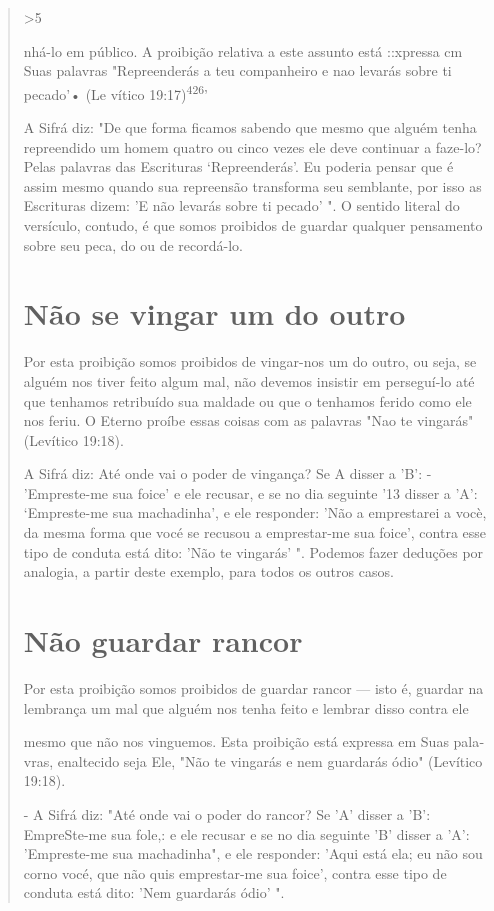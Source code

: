 \begin{quote}


\textgreater5

nhá-lo em público. A proibição relativa a este assunto está ::xpressa cm
Suas palavras "Repreenderás a teu companheiro e nao levarás sobre ti
pecado'• (Le vítico 19:17)\textsuperscript{426}'

A Sifrá diz: "De que forma ficamos sabendo que mesmo que alguém tenha
repreendido um homem quatro ou cinco vezes ele deve continuar a faze-lo?
Pelas palavras das Escrituras `Repreenderás'. Eu poderia pensar que é
assim mesmo quando sua repreensão transforma seu semblante, por isso as
Escritu­ras dizem: 'E não levarás sobre ti pecado' ". O sentido literal
do versículo, con­tudo, é que somos proibidos de guardar qualquer
pensamento sobre seu peca, do ou de recordá-lo.

\section{Não se vingar um do outro}

Por esta proibição somos proibidos de vingar-nos um do outro, ou seja,
se alguém nos tiver feito algum mal, não devemos insistir em perseguí-lo
até que tenhamos retribuído sua maldade ou que o tenhamos ferido como
ele nos feriu. O Eterno proíbe essas coisas com as palavras "Nao te
vingarás" (Le­vítico 19:18).

A Sifrá diz: Até onde vai o poder de vingança? Se A disser a 'B': -
'Empreste-me sua foice' e ele recusar, e se no dia seguinte '13 disser a
'A': `Empreste-me sua machadinha', e ele responder: 'Não a emprestarei a
vocè, da mesma forma que vocé se recusou a emprestar-me sua foice',
contra esse tipo de conduta está dito: 'Não te vingarás' ". Podemos
fazer deduções por analo­gia, a partir deste exemplo, para todos os
outros casos.

\section{Não guardar rancor}

Por esta proibição somos proibidos de guardar rancor --- isto é,
guar­dar na lembrança um mal que alguém nos tenha feito e lembrar disso
contra ele

mesmo que não nos vinguemos. Esta proibição está expressa em Suas
pala­vras, enaltecido seja Ele, "Não te vingarás e nem guardarás ódio"
(Levítico 19:18).

- A Sifrá diz: "Até onde vai o poder do rancor? Se 'A' disser a 'B':
EmpreSte-me sua fole,: e ele recusar e se no dia seguinte 'B' disser a
'A': 'Em­preste-me sua machadinha", e ele responder: 'Aqui está ela; eu
não sou corno vocé, que não quis emprestar-me sua foice', contra esse
tipo de conduta está di­to: 'Nem guardarás ódio' ".


\end{quote}
